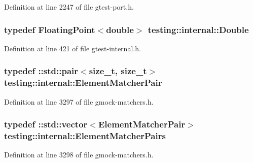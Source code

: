 Definition at line 2247 of file gtest-\/port.\+h.

\subsubsection[{\texorpdfstring{Double}{Double}}]{\setlength{\rightskip}{0pt plus 5cm}typedef {\bf Floating\+Point}$<$double$>$ {\bf testing\+::internal\+::\+Double}}\hypertarget{namespacetesting_1_1internal_a66a7579b1893b260c31dad577f7a5c48}{}\label{namespacetesting_1_1internal_a66a7579b1893b260c31dad577f7a5c48}


Definition at line 421 of file gtest-\/internal.\+h.

\subsubsection[{\texorpdfstring{Element\+Matcher\+Pair}{ElementMatcherPair}}]{\setlength{\rightskip}{0pt plus 5cm}typedef \+::std\+::pair$<$size\+\_\+t, size\+\_\+t$>$ {\bf testing\+::internal\+::\+Element\+Matcher\+Pair}}\hypertarget{namespacetesting_1_1internal_a109863545f08651178bf0f520aebd33b}{}\label{namespacetesting_1_1internal_a109863545f08651178bf0f520aebd33b}


Definition at line 3297 of file gmock-\/matchers.\+h.

\subsubsection[{\texorpdfstring{Element\+Matcher\+Pairs}{ElementMatcherPairs}}]{\setlength{\rightskip}{0pt plus 5cm}typedef \+::std\+::vector$<${\bf Element\+Matcher\+Pair}$>$ {\bf testing\+::internal\+::\+Element\+Matcher\+Pairs}}\hypertarget{namespacetesting_1_1internal_a0038618710c01a71150887dc7cfb0a29}{}\label{namespacetesting_1_1internal_a0038618710c01a71150887dc7cfb0a29}


Definition at line 3298 of file gmock-\/matchers.\+h.

